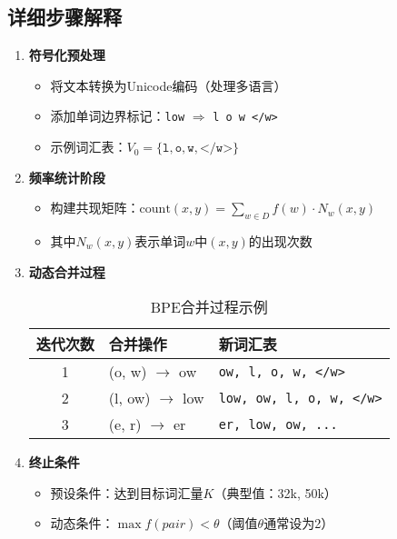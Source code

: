 \documentclass{article}
\begin{document}
\subsection{详细步骤解释}
\begin{enumerate}[label=\textbf{步骤 \arabic*},leftmargin=*]
    \item \textbf{符号化预处理}
    \begin{itemize}
        \item 将文本转换为Unicode编码（处理多语言）
        \item 添加单词边界标记：\texttt{low} $\Rightarrow$ \texttt{l o w </w>}
        \item 示例词汇表：$V_0 = \{\texttt{l}, \texttt{o}, \texttt{w}, \texttt{</w>}\}$
    \end{itemize}
    
    \item \textbf{频率统计阶段}
    \begin{itemize}
        \item 构建共现矩阵：$\text{count}(x,y) = \sum_{w \in D} f(w) \cdot N_w(x,y)$
        \item 其中$N_w(x,y)$表示单词$w$中$(x,y)$的出现次数
    \end{itemize}
    
    \item \textbf{动态合并过程}
    \begin{table}[H]
    \centering
    \caption{BPE合并过程示例}
    \begin{tabular}{cll}
    \toprule
    迭代次数 & 合并操作 & 新词汇表 \\
    \midrule
    1 & (o, w) $\rightarrow$ ow & \texttt{ow, l, o, w, </w>} \\
    2 & (l, ow) $\rightarrow$ low & \texttt{low, ow, l, o, w, </w>} \\
    3 & (e, r) $\rightarrow$ er & \texttt{er, low, ow, ...} \\
    \bottomrule
    \end{tabular}
    \end{table}
    
    \item \textbf{终止条件}
    \begin{itemize}
        \item 预设条件：达到目标词汇量$K$（典型值：32k, 50k）
        \item 动态条件：$\max f(pair) < \theta$（阈值$\theta$通常设为2）
    \end{itemize}
\end{enumerate}
\end{document}

